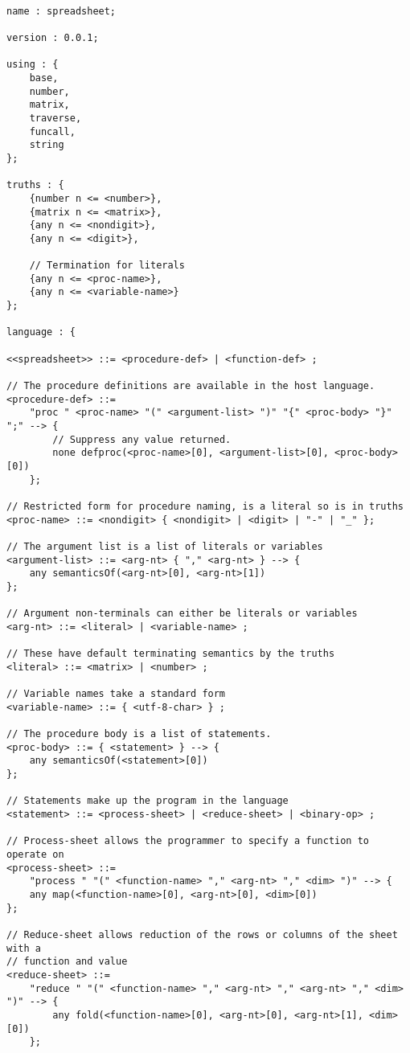 \begin{verbatim}

name : spreadsheet;

version : 0.0.1;

using : {
    base,
    number,
    matrix,
    traverse,
    funcall,
    string
};

truths : {
    {number n <= <number>},
    {matrix n <= <matrix>},
    {any n <= <nondigit>},
    {any n <= <digit>},

    // Termination for literals
    {any n <= <proc-name>},
    {any n <= <variable-name>}
};

language : {

<<spreadsheet>> ::= <procedure-def> | <function-def> ;

// The procedure definitions are available in the host language. 
<procedure-def> ::= 
    "proc " <proc-name> "(" <argument-list> ")" "{" <proc-body> "}" ";" --> {
        // Suppress any value returned.
        none defproc(<proc-name>[0], <argument-list>[0], <proc-body>[0])
    };

// Restricted form for procedure naming, is a literal so is in truths
<proc-name> ::= <nondigit> { <nondigit> | <digit> | "-" | "_" };

// The argument list is a list of literals or variables
<argument-list> ::= <arg-nt> { "," <arg-nt> } --> {
    any semanticsOf(<arg-nt>[0], <arg-nt>[1])
};

// Argument non-terminals can either be literals or variables
<arg-nt> ::= <literal> | <variable-name> ;

// These have default terminating semantics by the truths
<literal> ::= <matrix> | <number> ;

// Variable names take a standard form
<variable-name> ::= { <utf-8-char> } ;

// The procedure body is a list of statements.
<proc-body> ::= { <statement> } --> {
    any semanticsOf(<statement>[0])
};

// Statements make up the program in the language
<statement> ::= <process-sheet> | <reduce-sheet> | <binary-op> ;

// Process-sheet allows the programmer to specify a function to operate on
<process-sheet> ::= 
    "process " "(" <function-name> "," <arg-nt> "," <dim> ")" --> {
    any map(<function-name>[0], <arg-nt>[0], <dim>[0])
};

// Reduce-sheet allows reduction of the rows or columns of the sheet with a 
// function and value
<reduce-sheet> ::= 
    "reduce " "(" <function-name> "," <arg-nt> "," <arg-nt> "," <dim> ")" --> {
        any fold(<function-name>[0], <arg-nt>[0], <arg-nt>[1], <dim>[0])
    };


\end{verbatim}
